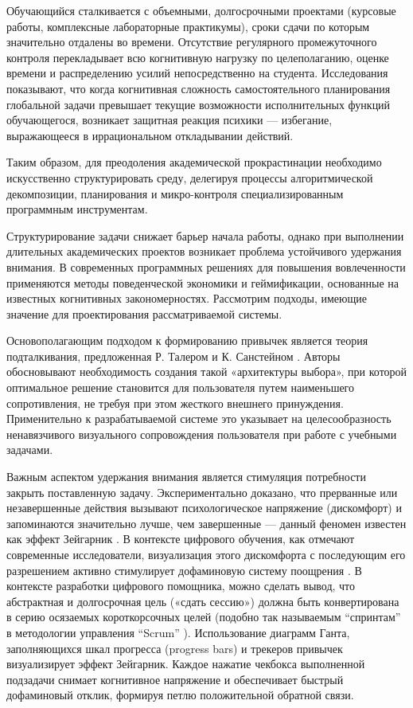 Обучающийся сталкивается с объемными, долгосрочными проектами (курсовые работы, комплексные лабораторные практикумы), сроки сдачи по которым значительно отдалены во времени. Отсутствие регулярного промежуточного контроля перекладывает всю когнитивную нагрузку по целеполаганию, оценке времени и распределению усилий непосредственно на студента. Исследования показывают, что когда когнитивная сложность самостоятельного планирования глобальной задачи превышает текущие возможности исполнительных функций обучающегося, возникает защитная реакция психики — избегание, выражающееся в иррациональном откладывании действий. 

Таким образом, для преодоления академической прокрастинации необходимо искусственно структурировать среду, делегируя процессы алгоритмической декомпозиции, планирования и микро-контроля специализированным программным инструментам.


\numberedparagraph
Структурирование задачи снижает барьер начала работы, однако при выполнении длительных академических проектов возникает проблема устойчивого удержания внимания. В современных программных решениях для повышения вовлеченности применяются методы поведенческой экономики и геймификации, основанные на известных когнитивных закономерностях. Рассмотрим подходы, имеющие значение для проектирования рассматриваемой системы. 

Основополагающим подходом к формированию привычек является теория подталкивания, предложенная Р. Талером и К. Санстейном \cite{Thaler2008}. Авторы обосновывают необходимость создания такой «архитектуры выбора», при которой оптимальное решение становится для пользователя путем наименьшего сопротивления, не требуя при этом жесткого внешнего принуждения. Применительно к разрабатываемой системе это указывает на целесообразность ненавязчивого визуального сопровождения пользователя при работе с учебными задачами. 


Важным аспектом удержания внимания является стимуляция потребности закрыть поставленную задачу. Экспериментально доказано, что прерванные или незавершенные действия вызывают психологическое напряжение (дискомфорт) и запоминаются значительно лучше, чем завершенные — данный феномен известен как эффект Зейгарник \cite{Zeigarnik1927}. В контексте цифрового обучения, как отмечают современные исследователи, визуализация этого дискомфорта с последующим его разрешением активно стимулирует дофаминовую систему поощрения \cite{Syndell2020}. В контексте разработки цифрового помощника, можно сделать вывод, что абстрактная и долгосрочная цель («сдать сессию») должна быть конвертирована в серию осязаемых короткорсочных целей (подобно так называемым ``спринтам'' в методологии управления ``Scrum'' \cite{Stahl1990}). Использование диаграмм Ганта, заполняющихся шкал прогресса (progress bars) и трекеров привычек визуализирует эффект Зейгарник. Каждое нажатие чекбокса выполненной подзадачи снимает когнитивное напряжение и обеспечивает быстрый дофаминовый отклик, формируя петлю положительной обратной связи. 


